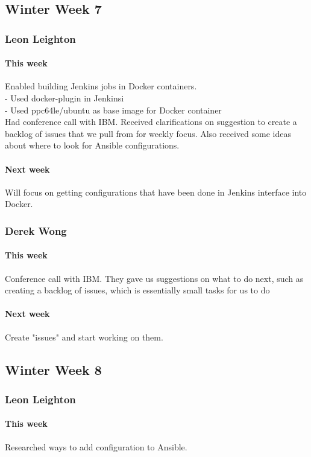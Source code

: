 \documentclass[10pt,letterpaper,onecolumn,draftclsnofoot]{IEEEtran}
\begin{document}
\subsection{Winter Week 7}
\subsubsection{Leon Leighton}
\paragraph{This week}Enabled building Jenkins jobs in Docker containers.\\
- Used docker-plugin in Jenkinsi\\
- Used ppc64le/ubuntu as base image for Docker container \\ 
Had conference call with IBM. Received clarifications on suggestion to create a backlog of issues that we pull from for weekly focus. Also received some ideas about where to look for Ansible configurations.  
\paragraph{Next week}Will focus on getting configurations that have been done in Jenkins interface into Docker.

\subsubsection{Derek Wong}
\paragraph{This week}Conference call with IBM. They gave us suggestions on what to do next, such as creating a backlog of issues, which is essentially small tasks for us to do
\paragraph{Next week}Create "issues" and start working on them.


\subsection{Winter Week 8}
\subsubsection{Leon Leighton}
\paragraph{This week}Researched ways to add configuration to Ansible.
\end{document}
